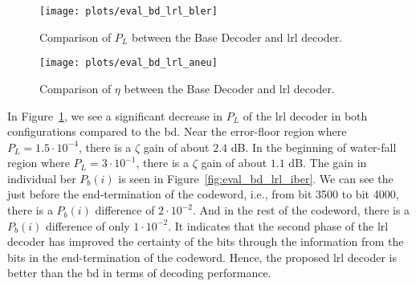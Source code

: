 \begin{figure}[htbp]
  \centering
  \texttt{[image: plots/eval\_bd\_lrl\_bler]}
  \caption[Comparison of \acrshort{bler} between the Base Decoder and \acrshort{lrl} decoder.]{Comparison of $P_L$ between the Base Decoder and \gls{lrl} decoder.}
  \label{fig:eval_bd_lrl_bler}
\end{figure}
\begin{figure}[htbp]
  \centering
  \texttt{[image: plots/eval\_bd\_lrl\_aneu]}
  \caption[Comparison of \acrshort{aneu} between the Base Decoder and \acrshort{lrl} decoder.]{Comparison of $\eta$ between the Base Decoder and \gls{lrl} decoder.}
  \label{fig:eval_bd_lrl_aneu}
\end{figure}

In Figure~\ref{fig:eval_bd_lrl_bler}, we see a significant decrease in $P_L$ of the \gls{lrl} decoder in both configurations compared to the \gls{bd}. Near the error-floor region where $P_L=1.5\cdot 10^{-4}$, there is a $\zeta$ gain of about $2.4$ dB. In the beginning of water-fall region where $P_L=3\cdot 10^{-1}$, there is a $\zeta$ gain of about $1.1$ dB. The gain in individual \gls{ber} $P_b(i)$ is seen in Figure~\ref{fig:eval_bd_lrl_iber}. We can see the just before the end-termination of the codeword, i.e., from bit 3500 to bit 4000, there is a $P_b(i)$ difference of $2\cdot 10^{-2}$. And in the rest of the codeword, there is a $P_b(i)$ difference of only $1\cdot 10^{-2}$. It indicates that the second phase of the \gls{lrl} decoder has improved the certainty of the bits through the information from the bits in the end-termination of the codeword. Hence, the proposed \gls{lrl} decoder is better than the \gls{bd} in terms of decoding performance.

